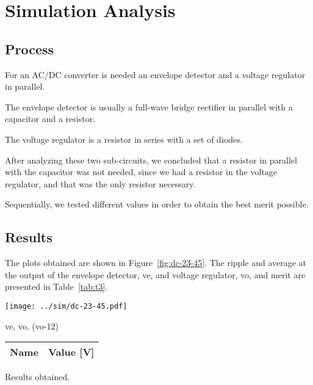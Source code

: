 \section{Simulation Analysis}
\label{sec:simulation}

\subsection{Process}

For an AC/DC converter is needed an envelope detector and a voltage regulator in parallel.

The envelope detector is usually a full-wave bridge rectifier in parallel
with a capacitor and a resistor.

The voltage regulator is a resistor in series with a set of diodes.

After analyzing these two sub-circuits, we concluded that a resistor in parallel
with the capacitor was not needed, since we had a resistor in the voltage
regulator, and that was the only resistor necessary.

Sequentially, we tested different values in order to obtain the best merit possible.


\subsection{Results}

The plots obtained are shown in Figure~\ref{fig:dc-23-45}. The ripple and average at the output
of the envelope detector, ve, and voltage regulator, vo, and merit are presented in Table~\ref{tab:t3}.\\


\begin{minipage}[b]{0.46\textwidth}
\centering
    \centering
    \texttt{[image: ../sim/dc-23-45.pdf]}
    \captionsetup{type=figure}
    \caption{ve, vo, (vo-12)}
    \label{fig:dc-23-45}
\end{minipage}
\hfill
\begin{minipage}[b]{0.46\textwidth}
\centering
   \begin{tabular}{|l|r|}
    \hline    
    {\bf Name} & {\bf Value [V]} \\ \hline
    
   \end{tabular}
    \captionsetup{type=table}   
  \caption{Results obtained.}
  \label{tab:t3}
\end{minipage}
